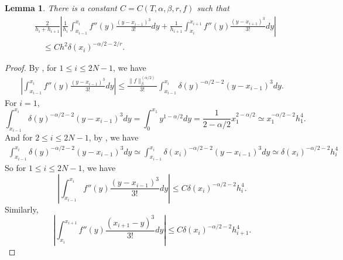 \documentclass{amsart}
\newtheorem{lemma}[theorem]{Lemma}
\theoremstyle{definition}
\theoremstyle{remark}
\numberwithin{equation}{section}
\begin{document}
\begin{lemma} \label{lmm:trucerr2d2f}
  There is a constant \(C=C(T, \alpha, \beta, r, f)\) such that
    \begin{equation*}
      \begin{aligned}
        & \frac{2}{h_i + h_{i+1}} \left| \frac{1}{h_i} \int_{x_{i-1}}^{x_{i}} f''(y) \frac{(y-x_{i-1})^3}{3!} dy + \frac{1}{h_{i+1}} \int_{x_{i}}^{x_{i+1}} f''(y) \frac{(y-x_{i+1})^3}{3!} dy \right| \\
         & \quad \le C h^2 \delta(x_i)^{-\alpha/2-2/r} .
      \end{aligned}
    \end{equation*}
\end{lemma}
\begin{proof} \label{prf:trucerr2d2f}
  By , for \(1 \le i \le 2N-1\), we have
  \begin{equation*}
    \begin{aligned}
      \left|\int_{x_{i-1}}^{x_{i}} f''(y)\frac{(y-x_{i-1})^3}{3!} dy \right|  \le \frac{\|f\|_{\beta}^{(\alpha/2)}}{3!} \int_{x_{i-1}}^{x_{i}} \delta(y)^{-\alpha/2-2} (y-x_{i-1})^3 dy .
    \end{aligned}
  \end{equation*}
  For \(i=1\),
  \begin{equation*}
    \int_{x_{i-1}}^{x_{i}} \delta(y)^{-\alpha/2-2} (y-x_{i-1})^3 dy
    = \int_{0}^{x_{1}} y^{1-\alpha/2} dy
    = \frac{1}{2-\alpha/2} x_1^{2-\alpha/2} \simeq x_1^{-\alpha/2-2} h_1^4 .
  \end{equation*}
  And for \(2\le i \le 2N-1\), by , we have
  \begin{equation*}
    \begin{aligned}
      \int_{x_{i-1}}^{x_{i}} \delta(y)^{-\alpha/2-2} (y-x_{i-1})^3 dy 
        \simeq \int_{x_{i-1}}^{x_{i}} \delta(x_i)^{-\alpha/2-2} (y-x_{i-1})^3 dy
        \simeq \delta(x_i)^{-\alpha/2-2} h_i^4
    \end{aligned}
  \end{equation*}
  So for  \(1\le i\le 2N-1\), we have 
  \begin{equation*}
    \left|\int_{x_{i-1}}^{x_{i}} f''(y)\frac{(y-x_{i-1})^3}{3!} dy \right| \le C \delta(x_i)^{-\alpha/2-2} h_i^4 .
  \end{equation*}
  Similarly,
  \begin{equation*}
    \left|\int_{x_{i}}^{x_{i+1}} f''(y)\frac{(x_{i+1}-y)^3}{3!} dy \right| \le C \delta(x_i)^{-\alpha/2-2} h_{i+1}^4 .
  \end{equation*}

\end{proof}
\end{document}
